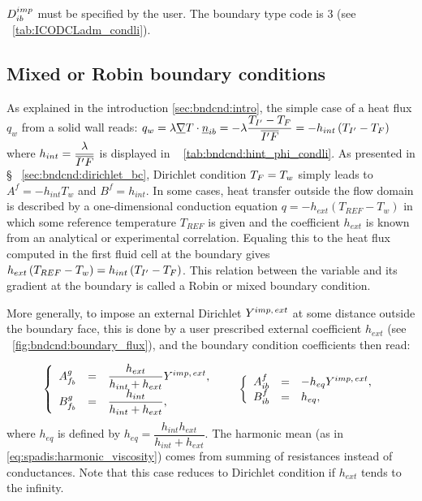 \begin{remark}
$D^{imp}_{ib}$ must be specified by the user. The boundary type code is $3$ (see \tablename~\ref{tab:ICODCLadm_condli}).
\end{remark}

\subsection{Mixed or Robin boundary conditions}
As explained in the introduction \ref{sec:bndcnd:intro}, the simple case of a heat flux $q_w$ from a solid wall reads: $q_w = \lambda \underline{\nabla} T \cdot \underline{n}_{ib} = - \lambda \dfrac{T_{I^\prime} - T_F}{\overline{{I^\prime} F}} = -h_{int} \left( T_{I^\prime} - T_F \right)$ where $h_{int} = \dfrac{\lambda}{\overline{{I^\prime} F}}$ is displayed in \tablename~ \ref{tab:bndcnd:hint_phi_condli}.
As presented in \S~ \ref{sec:bndcnd:dirichlet_bc}, Dirichlet condition $T_F = T_w$ simply leads to $A^f = - h_{int} T_w$ and $B^f = h_{int}$.
In some cases, heat transfer outside the flow domain is described by a one-dimensional conduction equation $q = -h_{ext} \left(T_{REF} - T_w \right)$
in which some reference temperature $T_{REF}$ is given and the coefficient $h_{ext}$ is known from an analytical or experimental correlation.
Equaling this to the heat flux computed in the first fluid cell at the boundary gives $ h_{ext} \left(T_{REF} - T_w \right) = h_{int} \left( T_{I^\prime} - T_F \right)$. This relation between the variable and its gradient at the boundary is called a Robin or mixed boundary condition.

More generally, to impose an external Dirichlet $Y^{imp, \, ext}$ at some distance outside the boundary face,
this is done by a user prescribed external coefficient $h_{ext}$
(see \figurename~\ref{fig:bndcnd:boundary_flux}), and the boundary condition coefficients then read:

\begin{equation}
\begin{array}{r c l}
\left\lbrace
\begin{array}{r c l}
A^g_{f_{b}} & = &\dfrac{h_{ext}}{h_{int}+h_{ext}} Y^{imp, \, ext}, \\
B^g_{f_{b}} & = & \dfrac{h_{int}}{h_{int}+h_{ext}} ,
\end{array}
\right.
& &
\left\lbrace
\begin{array}{r c l}
A^f_{ib} & = & -h_{eq} Y^{imp, \, ext} , \\
B^f_{ib} & = & h_{eq},
\end{array}
\right.
\end{array}
\end{equation}
where $h_{eq} $ is defined by $h_{eq}=\dfrac{h_{int} h_{ext}}{ h_{int} + h_{ext}}$.
The harmonic mean (as in \eqref{eq:spadis:harmonic_viscosity}) comes from summing of resistances instead of conductances.
Note that this case reduces to Dirichlet condition if $h_{ext}$ tends to the infinity.

